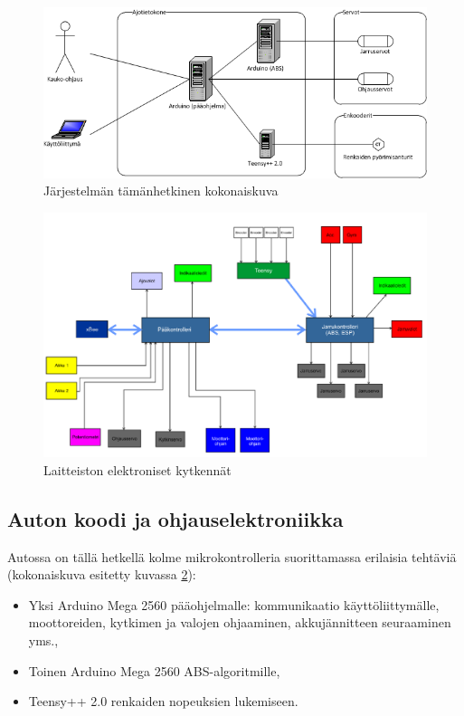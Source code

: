 \documentclass{article}
\begin{document}
\begin{figure}[p]
\centering
\includegraphics[width=\textwidth]{images/kommunikointirakenne}
\caption{Järjestelmän tämänhetkinen kokonaiskuva}
\label{fig:kommunikointirakenne}
\end{figure}

\begin{figure}[p]
\centering
\includegraphics[width=\textwidth]{images/elektroniikka}
\caption{Laitteiston elektroniset kytkennät}
\label{fig:elektroniikka}
\end{figure}

\subsection{Auton koodi ja ohjauselektroniikka}

Autossa on tällä hetkellä kolme mikrokontrolleria suorittamassa erilaisia tehtäviä (kokonaiskuva esitetty kuvassa \ref{fig:elektroniikka}):

\begin{itemize}
	\item Yksi Arduino Mega 2560 pääohjelmalle: kommunikaatio
		käyttöliittymälle, moottoreiden, kytkimen ja valojen ohjaaminen,
		akkujännitteen seuraaminen yms.,
	\item Toinen Arduino Mega 2560 ABS-algoritmille,
	\item Teensy++ 2.0 renkaiden nopeuksien lukemiseen.
\end{itemize}
\end{document}
